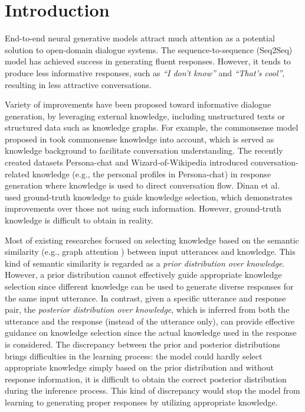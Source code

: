 \documentclass{article}
\newcommand\blfootnote[1]{%
  \begingroup
  \renewcommand\thefootnote{}\footnote{#1}%
  \addtocounter{footnote}{-1}%
  \endgroup
}
\begin{document}

\section{Introduction}
End-to-end neural generative models attract much attention as a potential solution to open-domain dialogue systems.
The sequence-to-sequence (Seq2Seq) model \cite{shang2015neural,vinyals2015neural,cho2014learning} has achieved success in generating fluent responses. 
However, it tends to produce less informative responses, such as \textit{``I don't know''} and \textit{``That's cool''}, resulting in less attractive conversations. 

Variety of improvements \cite{zhou2018commonsense,ghazvininejad2018knowledge,liu2018knowledge} have been proposed toward informative dialogue generation, by leveraging external knowledge, including unstructured texts or structured data such as knowledge graphs.  
%
For example, the commonsense model proposed in \cite{zhou2018commonsense} took commonsense knowledge into account, which is served as knowledge background to facilitate conversation understanding.
The recently created datasets
Persona-chat \cite{zhang2018personalizing} and Wizard-of-Wikipedia \cite{dinan2018wizard} introduced conversation-related knowledge (e.g., the personal profiles in Persona-chat) in response generation 
where knowledge is used to direct conversation flow. 
Dinan et al.~ used ground-truth knowledge to guide knowledge selection, which demonstrates improvements over those not using such information.
However, ground-truth knowledge is difficult to obtain in reality.

Most of existing researches focused on selecting knowledge based on the semantic similarity (e.g., graph attention \cite{zhou2018commonsense}) between input utterances and knowledge.
This kind of semantic similarity is regarded as a \emph{prior distribution over knowledge}. 
However, a prior distribution cannot effectively guide appropriate knowledge selection since different knowledge can be used to generate diverse responses for the same input utterance. 
In contrast, given a specific utterance and response pair, 
the \emph{posterior distribution over knowledge}, which is inferred from both the utterance and the response (instead of the utterance only), can provide effective guidance on knowledge selection 
since the actual knowledge used in the response is considered. 
%
The discrepancy between the prior and posterior distributions brings difficulties in the learning process: 
the model could hardly select appropriate knowledge simply based on the prior distribution and without response information, 
it is difficult to obtain the correct posterior distribution during the inference process. 
This kind of discrepancy would stop the model from learning to generating proper responses by utilizing appropriate knowledge.
\end{document}
